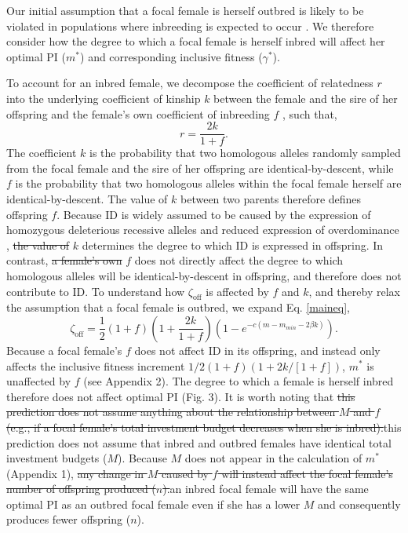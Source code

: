 \documentclass[12pt]{article}
\begin{document}
Our initial assumption that a focal female is herself outbred is likely to be violated in populations where inbreeding is expected to occur \cite[][]{Duthie2015a}. We therefore consider how the degree to which a focal female is herself inbred will affect her optimal PI ($m^{*}$) and corresponding inclusive fitness ($\gamma^{*}$).

To account for an inbred female, we decompose the coefficient of relatedness $r$ into the underlying coefficient of kinship $k$ between the female and the sire of her offspring and the female's own coefficient of inbreeding $f$  \cite[see][]{Hamilton1972, Michod1979}, such that,
\begin{equation} \label{rdef}
r = \frac{2k}{1 + f}.
\end{equation}
The coefficient $k$ is the probability that two homologous alleles randomly sampled from the focal female and the sire of her offspring are identical-by-descent, while $f$ is the probability that two homologous alleles within the focal female herself are identical-by-descent. The value of $k$ between two parents therefore defines offspring $f$. Because ID is widely assumed to be caused by the expression of homozygous deleterious recessive alleles and reduced expression of overdominance \cite[][]{Charlesworth2009}, {\color{red}\st{the value of}} $k$ determines the degree to which ID is expressed in offspring. In contrast, {\color{red}\st{a female's own}} $f$ does not directly affect the degree to which homologous alleles will be identical-by-descent in offspring, and therefore does not contribute to ID. To understand how $\zeta_{\textrm{off}}$ is affected by $f$ and $k$, and thereby relax the assumption that a focal female is outbred, we expand Eq. \ref{maineq},
\begin{equation} \label{maineqr}
\zeta_{\textrm{off}} = \frac{1}{2}\left(1+f\right)\left(1+\frac{2k}{1+f}\right)\left(1-e^{-c\left(m-m_{min}-2\beta k\right)}\right).
\end{equation}
Because a focal female's $f$ does not affect ID in its offspring, and instead only affects the inclusive fitness increment $1/2\left(1+f\right)\left(1+ 2 k / \left[1 + f\right]\right)$, $m^{*}$ is unaffected by $f$  (see Appendix 2). The degree to which a female is herself inbred therefore does not affect optimal PI (Fig. 3). It is worth noting that {\color{red}\st{this prediction does not assume anything about the relationship between $M$ and $f$ (e.g., if a focal female's total investment budget decreases when she is inbred).}}{\color{blue}this prediction does not assume that inbred and outbred females have identical total investment budgets ($M$)}. Because $M$ does not appear in the calculation of $m^{*}$ (Appendix 1), {\color{red}\st{any change in $M$ caused by $f$ will instead affect the focal female's number of offspring produced ($n$).}}{\color{blue}an inbred focal female will have the same optimal PI as an outbred focal female even if she has a lower $M$ and consequently produces fewer offspring ($n$).}
\end{document}

